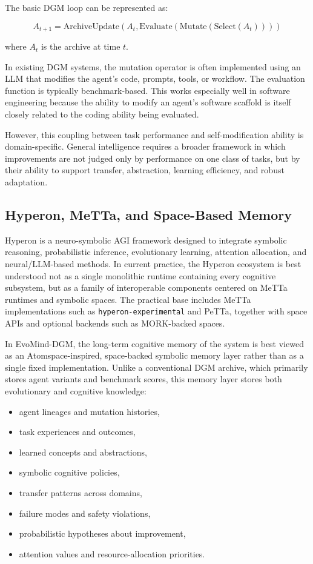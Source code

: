 \documentclass[11pt]{article}
\begin{document}
The basic DGM loop can be represented as:

\begin{equation}
A_{t+1} = \text{ArchiveUpdate}(A_t, \text{Evaluate}(\text{Mutate}(\text{Select}(A_t))))
\end{equation}

where $A_t$ is the archive at time $t$.

In existing DGM systems, the mutation operator is often implemented using an LLM that modifies the agent's code, prompts, tools, or workflow. The evaluation function is typically benchmark-based. This works especially well in software engineering because the ability to modify an agent's software scaffold is itself closely related to the coding ability being evaluated.

However, this coupling between task performance and self-modification ability is domain-specific. General intelligence requires a broader framework in which improvements are not judged only by performance on one class of tasks, but by their ability to support transfer, abstraction, learning efficiency, and robust adaptation.

\subsection{Hyperon, MeTTa, and Space-Based Memory}

Hyperon is a neuro-symbolic AGI framework designed to integrate symbolic reasoning, probabilistic inference, evolutionary learning, attention allocation, and neural/LLM-based methods. In current practice, the Hyperon ecosystem is best understood not as a single monolithic runtime containing every cognitive subsystem, but as a family of interoperable components centered on MeTTa runtimes and symbolic spaces. The practical base includes MeTTa implementations such as \texttt{hyperon-experimental} and PeTTa, together with space APIs and optional backends such as MORK-backed spaces.

In EvoMind-DGM, the long-term cognitive memory of the system is best viewed as an Atomspace-inspired, space-backed symbolic memory layer rather than as a single fixed implementation. Unlike a conventional DGM archive, which primarily stores agent variants and benchmark scores, this memory layer stores both evolutionary and cognitive knowledge:

\begin{itemize}[leftmargin=*]
    \item agent lineages and mutation histories,
    \item task experiences and outcomes,
    \item learned concepts and abstractions,
    \item symbolic cognitive policies,
    \item transfer patterns across domains,
    \item failure modes and safety violations,
    \item probabilistic hypotheses about improvement,
    \item attention values and resource-allocation priorities.
\end{itemize}
\end{document}
